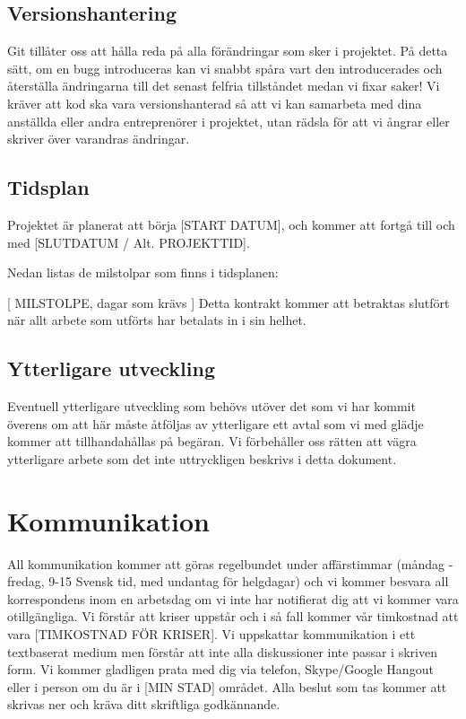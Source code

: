 \documentclass[10pt,a4paper,parskip]{scrartcl}
\begin{document}
\subsection{Versionshantering}

Git tillåter oss att hålla reda på alla förändringar som sker i projektet. På
detta sätt, om en bugg introduceras kan vi snabbt spåra vart den introducerades
och återställa ändringarna till det senast felfria tillståndet medan vi fixar
saker! Vi kräver att kod ska vara versionshanterad så att vi kan samarbeta med
dina anställda eller andra entreprenörer i projektet, utan rädsla för att vi
ångrar eller skriver över varandras ändringar.

\subsection{Tidsplan}

Projektet är planerat att börja [START DATUM], och kommer att fortgå till och
med [SLUTDATUM / Alt. PROJEKTTID].

Nedan listas de milstolpar som finns i tidsplanen:

[ MILSTOLPE, dagar som krävs ] Detta kontrakt kommer att betraktas
slutfört när allt arbete som utförts har betalats in i sin helhet.

\subsection{Ytterligare utveckling}
Eventuell ytterligare utveckling som behövs utöver det som vi har kommit
överens om att här måste åtföljas av ytterligare ett avtal som vi med glädje
kommer att tillhandahållas på begäran. Vi förbehåller oss rätten att vägra
ytterligare arbete som det inte uttryckligen beskrivs i detta dokument.

\section{Kommunikation}
All kommunikation kommer att göras regelbundet under affärstimmar
(måndag - fredag, 9-15 Svensk tid, med undantag för helgdagar) och vi kommer
besvara all korrespondens inom en arbetsdag om vi inte har notifierat dig att
vi kommer vara otillgängliga. Vi förstår att kriser uppstår och i så fall
kommer vår timkostnad att vara [TIMKOSTNAD FÖR KRISER]. Vi uppskattar
kommunikation i ett textbaserat medium men förstår att inte alla diskussioner
inte passar i skriven form. Vi kommer gladligen prata med dig via telefon,
Skype/Google Hangout eller i person om du är i [MIN STAD] området. Alla beslut
som tas kommer att skrivas ner och kräva ditt skriftliga godkännande.
\end{document}
